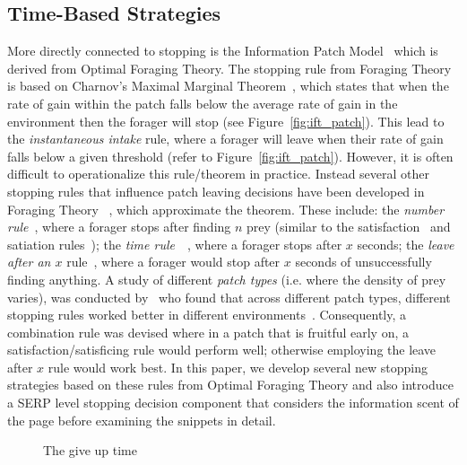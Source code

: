 \subsection{Time-Based Strategies}
More directly connected to stopping is the Information Patch Model~\cite{pirolli1999ift} which is derived from Optimal Foraging Theory. The stopping rule from Foraging Theory is based on Charnov's Maximal Marginal Theorem~\cite{charnov1976mvt}, which states that when the rate of gain within the patch falls below the average rate of gain in the environment then the forager will stop (see Figure~\ref{fig:ift_patch}). This lead to the \emph{instantaneous intake} rule, where a forager will leave when their rate of gain falls below a given threshold (refer to Figure~\ref{fig:ift_patch}). However, it is often difficult to operationalize this rule/theorem in practice. Instead several other stopping rules that influence patch leaving decisions have been developed in Foraging Theory ~\citet{stephens1986foraging_theory}, which approximate the theorem. These  include: the \emph{number rule}~\cite{gibbs1958number_rule}, where a forager stops after finding $n$ prey (similar to the satisfaction~\cite{cooper1973retrieval_effectiveness} and satiation rules~\cite{kraft1979stopping_rules}); the \emph{time rule}~\cite{krebs1973time_rule}~\cite{charles1972behaviour}, where a forager stops after $x$ seconds; the \emph{leave after an $x$} rule~\cite{krebs1974leave_after_rule}, where a forager would stop after $x$ seconds of unsuccessfully finding anything. A study of different \emph{patch types} (i.e. where the density of prey varies), was conducted by~\citet{mcnair1982gut_mvt} who found that across different patch types, different stopping rules worked better in different environments~\cite{mcnair1982gut_mvt, green1984oft_stopping, iwasa1981prey_distribution}. Consequently, a combination rule was devised where in a patch that is fruitful early on, a satisfaction/satisficing rule would perform well; otherwise employing the leave after $x$ rule would work best. In this paper, we develop several new stopping strategies based on these rules from Optimal Foraging Theory and also introduce a SERP level stopping decision component that considers the information scent of the page before examining the snippets in detail.

\begin{figure}[t!]
    \centering
    \caption[Give Up Time]{The give up time}
    \label{fig:gut}
\end{figure}

